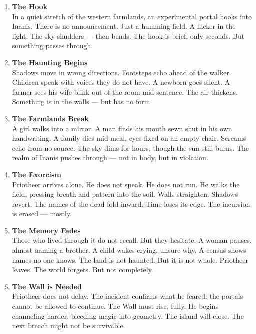 \documentclass[9pt]{article}
\begin{document}
\begin{enumerate}
    \item \textbf{The Hook} \\
    In a quiet stretch of the western farmlands, an experimental portal hooks into Inanis. There is no announcement. Just a humming field. A flicker in the light. The sky shudders — then bends. The hook is brief, only seconds. But something passes through.

    \vspace{1em}
    \item \textbf{The Haunting Begins} \\
    Shadows move in wrong directions. Footsteps echo ahead of the walker. Children speak with voices they do not have. A newborn goes silent. A farmer sees his wife blink out of the room mid-sentence. The air thickens. Something is in the walls — but has no form.

    \vspace{1em}
    \item \textbf{The Farmlands Break} \\
    A girl walks into a mirror. A man finds his mouth sewn shut in his own handwriting. A family dies mid-meal, eyes fixed on an empty chair. Screams echo from no source. The sky dims for hours, though the sun still burns. The realm of Inanis pushes through — not in body, but in violation.

    \vspace{1em}
    \item \textbf{The Exorcism} \\
    Priotheer arrives alone. He does not speak. He does not run. He walks the field, pressing breath and pattern into the soil. Walls straighten. Shadows revert. The names of the dead fold inward. Time loses its edge. The incursion is erased — mostly.

    \vspace{1em}
    \item \textbf{The Memory Fades} \\
    Those who lived through it do not recall. But they hesitate. A woman pauses, almost naming a brother. A child wakes crying, unsure why. A census shows names no one knows. The land is not haunted. But it is not whole. Priotheer leaves. The world forgets. But not completely.

    \vspace{1em}
    \item \textbf{The Wall is Needed} \\
    Priotheer does not delay. The incident confirms what he feared: the portals cannot be allowed to continue. The Wall must rise, fully. He begins channeling harder, bleeding magic into geometry. The island will close. The next breach might not be survivable.

\end{enumerate}
\end{document}
